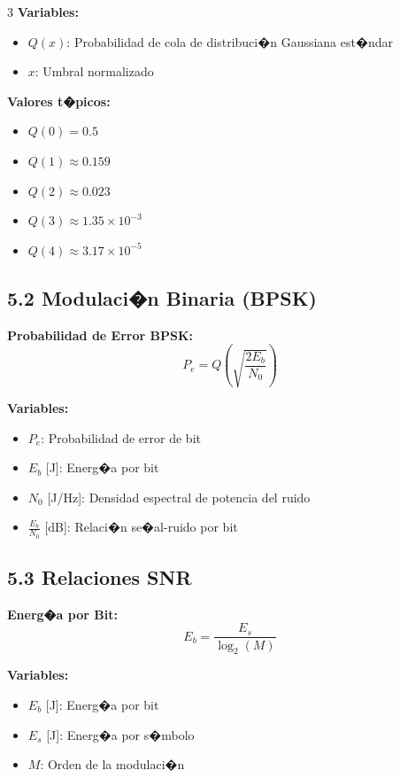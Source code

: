 ﻿\documentclass[8pt,a4paper]{article}
\begin{document}
\begin{multicols}{3}
\textbf{Variables:}
\begin{itemize}[leftmargin=*,itemsep=0pt]
    \item $Q(x)$: Probabilidad de cola de distribuci�n Gaussiana est�ndar
    \item $x$: Umbral normalizado
\end{itemize}

\textbf{Valores t�picos:}
\begin{itemize}[leftmargin=*,itemsep=0pt]
    \item $Q(0) = 0.5$
    \item $Q(1) \approx 0.159$
    \item $Q(2) \approx 0.023$
    \item $Q(3) \approx 1.35 \times 10^{-3}$
    \item $Q(4) \approx 3.17 \times 10^{-5}$
\end{itemize}

\vspace{-2mm}
\subsection*{\small 5.2 Modulaci�n Binaria (BPSK)}
\vspace{-2mm}

\textbf{Probabilidad de Error BPSK:}
\[
P_e = Q\left(\sqrt{\frac{2E_b}{N_0}}\right)
\]

\textbf{Variables:}
\begin{itemize}[leftmargin=*,itemsep=0pt]
    \item $P_e$: Probabilidad de error de bit
    \item $E_b$ [J]: Energ�a por bit
    \item $N_0$ [J/Hz]: Densidad espectral de potencia del ruido
    \item $\frac{E_b}{N_0}$ [dB]: Relaci�n se�al-ruido por bit
\end{itemize}

\vspace{-2mm}
\subsection*{\small 5.3 Relaciones SNR}
\vspace{-2mm}

\textbf{Energ�a por Bit:}
\[
E_b = \frac{E_s}{\log_2(M)}
\]

\textbf{Variables:}
\begin{itemize}[leftmargin=*,itemsep=0pt]
    \item $E_b$ [J]: Energ�a por bit
    \item $E_s$ [J]: Energ�a por s�mbolo
    \item $M$: Orden de la modulaci�n
\end{itemize}


\end{multicols}
\end{document}

